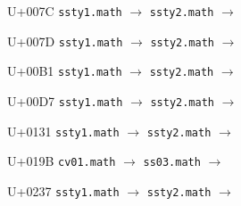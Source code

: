 \documentclass{article}
\begin{document}
\begin{substitutions}
\goodbreak

U+007C  \linebreak
    \texttt{ssty1.math} $\to$  \linebreak
    \texttt{ssty2.math} $\to$  

\goodbreak

U+007D  \linebreak
    \texttt{ssty1.math} $\to$  \linebreak
    \texttt{ssty2.math} $\to$  

\goodbreak

\end{substitutions}

\clearpage

\begin{substitutions}

U+00B1  \linebreak
    \texttt{ssty1.math} $\to$  \linebreak
    \texttt{ssty2.math} $\to$  

\goodbreak

U+00D7  \linebreak
    \texttt{ssty1.math} $\to$  \linebreak
    \texttt{ssty2.math} $\to$  

\goodbreak

\end{substitutions}

\clearpage

\begin{substitutions}

U+0131  \linebreak
    \texttt{ssty1.math} $\to$  \linebreak
    \texttt{ssty2.math} $\to$  

\goodbreak

\end{substitutions}

\clearpage

\begin{substitutions}

U+019B  \linebreak
    \texttt{cv01.math} $\to$  \linebreak
    \texttt{ss03.math} $\to$  

\goodbreak

U+0237  \linebreak
    \texttt{ssty1.math} $\to$  \linebreak
    \texttt{ssty2.math} $\to$  

\goodbreak

\end{substitutions}
\end{document}
